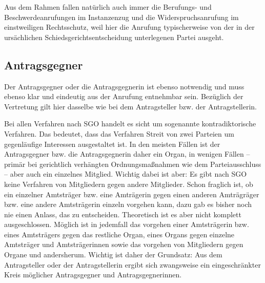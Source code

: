 Aus dem Rahmen fallen natürlich auch immer die Berufungs- und Beschwerdeanrufungen im Instanzenzug und die Widerspruchsanrufung im einstweiligen Rechtsschutz, weil hier die Anrufung typischerweise von der in der ursächlichen Schiedsgerichtsentscheidung unterlegenen Partei ausgeht.

\subsection{Antragsgegner}
\label{Anrufung:Statthaftigkeit:Antragsgegner}
Der Antragsgegner oder die Antragsgegnerin ist ebenso notwendig und muss ebenso klar und eindeutig aus der Anrufung entnehmbar sein. Bezüglich der Vertretung gilt hier dasselbe wie bei dem  Antragsteller bzw. der Antragstellerin.

Bei allen Verfahren nach SGO handelt es sicht um sogenannte kontradiktorische Verfahren.
Das bedeutet, dass das Verfahren Streit von zwei Parteien um gegenläufige Interessen ausgestaltet ist.
In den meisten Fällen ist der Antragsgegner bzw. die Antragsgegnerin daher ein Organ, in wenigen Fällen -- primär bei gerichtlich verhängten Ordnungsmaßnahmen wie dem Parteiausschluss -- aber auch ein einzelnes Mitglied.
Wichtig dabei ist aber: Es gibt nach SGO keine Verfahren von Mitgliedern gegen andere Mitglieder.
Schon fraglich ist, ob ein einzelner Amtsträger bzw. eine Amträgerin gegen einen anderen Amträgräger bzw. eine andere
Amtsträgerin einzeln vorgehen kann, dazu gab es bisher noch nie einen Anlass, das zu entscheiden.
Theoretisch ist es aber nicht komplett ausgeschlossen.
Möglich ist in jedemfall das vorgehen einer Amtsträgerin bzw. eines Amtsträgers gegen das restliche Organ, eines Organs  gegen einzelne Amtsträger und Amtsträgerinnen sowie das vorgehen von Mitgliedern gegen Organe und andersherum.
Wichtig ist daher der Grundsatz: Aus dem Antragsteller oder der Antragstellerin ergibt sich zwangsweise ein eingeschränkter Kreis möglicher Antragsgegner und Antragsgegnerinnen.

